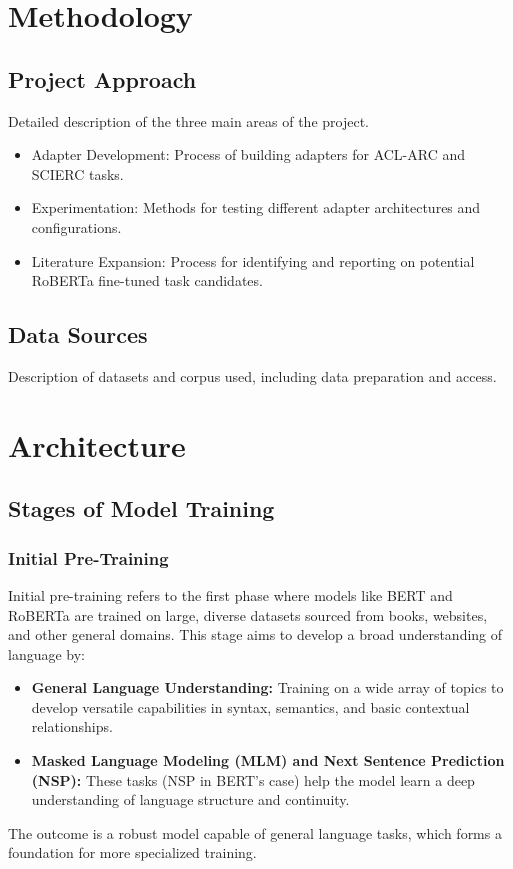 \documentclass[12pt]{article}
\begin{document}
\section{Methodology}
\subsection{Project Approach}
Detailed description of the three main areas of the project.
\begin{itemize}
    \item Adapter Development: Process of building adapters for ACL-ARC and SCIERC tasks.
    \item Experimentation: Methods for testing different adapter architectures and configurations.
    \item Literature Expansion: Process for identifying and reporting on potential RoBERTa fine-tuned task candidates.
\end{itemize}
\subsection{Data Sources}
Description of datasets and corpus used, including data preparation and access.


\section{Architecture}

\subsection{Stages of Model Training}

\subsubsection{Initial Pre-Training}
Initial pre-training refers to the first phase where models like BERT and RoBERTa are trained on large, diverse datasets sourced from books, websites, and other general domains. This stage aims to develop a broad understanding of language by:
\begin{itemize}
    \item \textbf{General Language Understanding:} Training on a wide array of topics to develop versatile capabilities in syntax, semantics, and basic contextual relationships.
    \item \textbf{Masked Language Modeling (MLM) and Next Sentence Prediction (NSP):} These tasks (NSP in BERT's case) help the model learn a deep understanding of language structure and continuity.
\end{itemize}
The outcome is a robust model capable of general language tasks, which forms a foundation for more specialized training.
\end{document}
